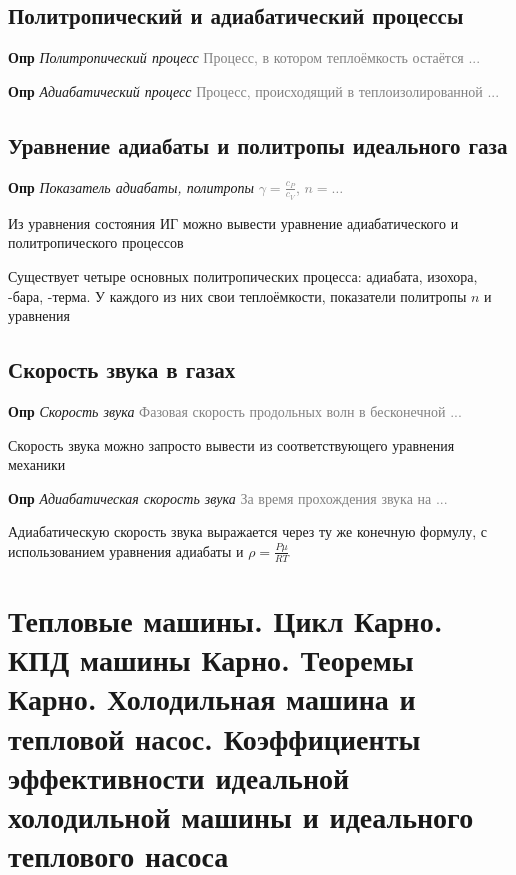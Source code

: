 \documentclass[a4paper, 14pt]{article}
\begin{document}
    \subsection{Политропический и адиабатический процессы}
    
    \textbf{Опр} \textit{Политропический процесс} \textcolor{gray}{Процесс, в котором теплоёмкость остаётся ...}
    
    \textbf{Опр} \textit{Адиабатический процесс} \textcolor{gray}{Процесс, происходящий в теплоизолированной ...}
    
    \subsection{Уравнение адиабаты и политропы идеального газа}
    
    \textbf{Опр} \textit{Показатель адиабаты, политропы} \textcolor{gray}{$\gamma = \frac{c_P}{c_V}$, $n = \dots$}
    
    Из уравнения состояния ИГ можно вывести уравнение адиабатического и политропического процессов
    
    Существует четыре основных политропических процесса: адиабата, изохора, -бара, -терма.
    У каждого из них свои теплоёмкости, показатели политропы $n$ и уравнения
    
    \subsection{Скорость звука в газах}
    
    \textbf{Опр} \textit{Скорость звука} \textcolor{gray}{Фазовая скорость продольных волн в бесконечной ...}
    
    Скорость звука можно запросто вывести из соответствующего уравнения механики
    
    \textbf{Опр} \textit{Адиабатическая скорость звука} \textcolor{gray}{За время прохождения звука на ...}
    
    Адиабатическую скорость звука выражается через ту же конечную формулу, с использованием уравнения адиабаты и
    $\rho = \frac{P \mu}{RT}$
    
    \section{Тепловые машины.
    Цикл Карно.
    КПД машины Карно.
    Теоремы Карно.
    Холодильная машина и тепловой насос.
    Коэффициенты эффективности идеальной холодильной машины и идеального теплового насоса}
    
\end{document}
